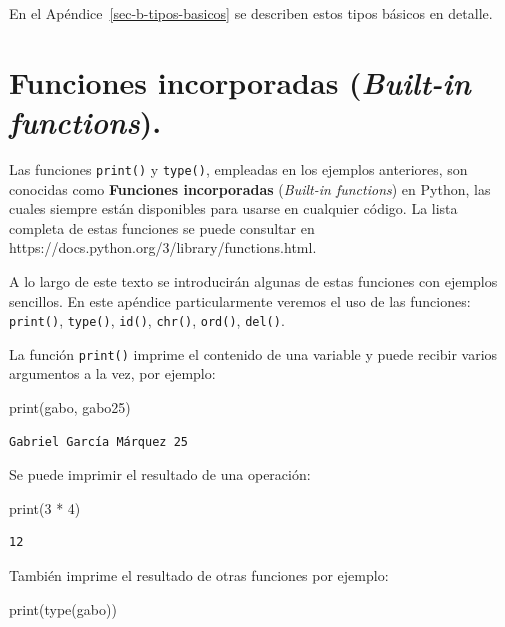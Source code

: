 \documentclass[
  spanish,
  letterpaper,
]{scrbook}
\newenvironment{Shaded}{\begin{snugshade}}{\end{snugshade}}
\newcommand{\BuiltInTok}[1]{\textcolor[rgb]{0.00,0.23,0.31}{#1}}
\newcommand{\DecValTok}[1]{\textcolor[rgb]{0.68,0.00,0.00}{#1}}
\newcommand{\NormalTok}[1]{\textcolor[rgb]{0.00,0.23,0.31}{#1}}
\newcommand{\OperatorTok}[1]{\textcolor[rgb]{0.37,0.37,0.37}{#1}}
\theoremstyle{definition}
\theoremstyle{remark}
\begin{document}
En el Apéndice~\ref{sec-b-tipos-basicos} se describen estos tipos
básicos en detalle.

\section{\texorpdfstring{Funciones incorporadas (\emph{Built-in
functions}).}{Funciones incorporadas (Built-in functions).}}\label{sec-a-funciones-incorporadas}

Las funciones \texttt{print()} y \texttt{type()}, empleadas en los
ejemplos anteriores, son conocidas como \textbf{Funciones incorporadas}
(\emph{Built-in functions}) en Python, las cuales siempre están
disponibles para usarse en cualquier código. La lista completa de estas
funciones se puede consultar en
https://docs.python.org/3/library/functions.html.

A lo largo de este texto se introducirán algunas de estas funciones con
ejemplos sencillos. En este apéndice particularmente veremos el uso de
las funciones: \texttt{print()}, \texttt{type()}, \texttt{id()},
\texttt{chr()}, \texttt{ord()}, \texttt{del()}.

La función \texttt{print()} imprime el contenido de una variable y puede
recibir varios argumentos a la vez, por ejemplo:

\begin{Shaded}
\begin{Highlighting}[]
\BuiltInTok{print}\NormalTok{(gabo, gabo25)}
\end{Highlighting}
\end{Shaded}

\begin{verbatim}
Gabriel García Márquez 25
\end{verbatim}

Se puede imprimir el resultado de una operación:

\begin{Shaded}
\begin{Highlighting}[]
\BuiltInTok{print}\NormalTok{(}\DecValTok{3} \OperatorTok{*} \DecValTok{4}\NormalTok{)}
\end{Highlighting}
\end{Shaded}

\begin{verbatim}
12
\end{verbatim}

También imprime el resultado de otras funciones por ejemplo:

\begin{Shaded}
\begin{Highlighting}[]
\BuiltInTok{print}\NormalTok{(}\BuiltInTok{type}\NormalTok{(gabo))}
\end{Highlighting}
\end{Shaded}
\end{document}
